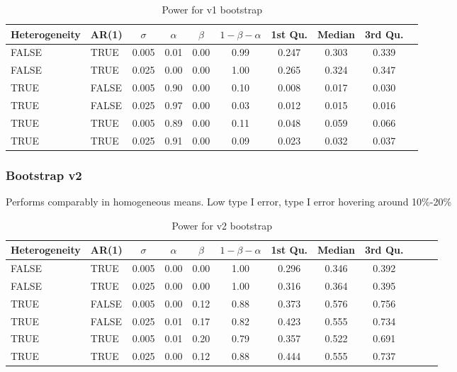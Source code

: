 \documentclass{article}
\begin{document}
\begin{table}[H]
\centering
\begin{tabular}{llcccccccc}
  \hline
Heterogeneity & AR(1) & $\sigma$ & $\alpha$ & $\beta$ & $1 - \beta - \alpha$ & 1st Qu. & Median & 3rd Qu.  \\ 
  \hline
FALSE & TRUE & 0.005 & 0.01 & 0.00 & 0.99 & 0.247 & 0.303 & 0.339 \\ 
  FALSE & TRUE & 0.025 & 0.00 & 0.00 & 1.00 & 0.265 & 0.324 & 0.347 \\ 
  TRUE & FALSE & 0.005 & 0.90 & 0.00 & 0.10 & 0.008 & 0.017 & 0.030 \\ 
  TRUE & FALSE & 0.025 & 0.97 & 0.00 & 0.03 & 0.012 & 0.015 & 0.016 \\ 
  TRUE & TRUE & 0.005 & 0.89 & 0.00 & 0.11 & 0.048 & 0.059 & 0.066 \\ 
  TRUE & TRUE & 0.025 & 0.91 & 0.00 & 0.09 & 0.023 & 0.032 & 0.037 \\ 
   \hline
\end{tabular}
\caption{Power for v1 bootstrap} 
\label{tab:bad_boot_pwr}
\end{table}

\subsubsection{Bootstrap v2}

Performs comparably in homogeneous means. Low type I error, type I error hovering around 10\%-20\%

\begin{table}[H]
\centering
\begin{tabular}{llcccccccccc}
  \hline
Heterogeneity & AR(1) & $\sigma$  & $\alpha$ & $\beta$ & $1 - \beta - \alpha$  & 1st Qu. & Median & 3rd Qu. \\ 
  \hline
FALSE & TRUE & 0.005 & 0.00 & 0.00 & 1.00 & 0.296 & 0.346 & 0.392 \\ 
  FALSE & TRUE & 0.025 & 0.00 & 0.00 & 1.00 & 0.316 & 0.364 & 0.395 \\ 
  TRUE & FALSE & 0.005 & 0.00 & 0.12 & 0.88 & 0.373 & 0.576 & 0.756 \\ 
  TRUE & FALSE & 0.025 & 0.01 & 0.17 & 0.82 & 0.423 & 0.555 & 0.734 \\ 
  TRUE & TRUE & 0.005 & 0.01 & 0.20 & 0.79 & 0.357 & 0.522 & 0.691 \\ 
  TRUE & TRUE & 0.025 & 0.00 & 0.12 & 0.88 & 0.444 & 0.555 & 0.737 \\ 
   \hline
\end{tabular}
\caption{Power for v2 bootstrap} 
\label{tab:good_boot_pwr}
\end{table}
\end{document}
